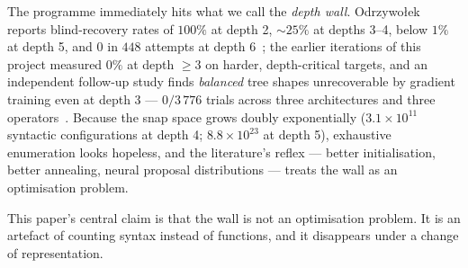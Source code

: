\documentclass[11pt]{article}
\begin{document}
The programme immediately hits what we call the \emph{depth wall}.
Odrzywo{\l}ek reports blind-recovery rates of $100\%$ at depth 2,
${\sim}25\%$ at depths 3--4, below $1\%$ at depth 5, and $0$ in $448$
attempts at depth 6~\cite{odrzywolek2026eml}; the earlier iterations
of this project measured $0\%$ at depth $\ge 3$ on harder,
depth-critical targets, and an independent follow-up study finds
\emph{balanced} tree shapes unrecoverable by gradient training even
at depth 3 — $0/3\,776$ trials across three architectures and three
operators~\cite{gupta2026arch}. Because the snap space grows doubly
exponentially ($3.1\times10^{11}$ syntactic configurations at depth 4;
$8.8\times10^{23}$ at depth 5), exhaustive enumeration looks hopeless,
and the literature's reflex — better initialisation, better annealing,
neural proposal distributions — treats the wall as an optimisation
problem.

This paper's central claim is that the wall is not an optimisation
problem. It is an artefact of counting syntax instead of functions,
and it disappears under a change of representation.
\end{document}
